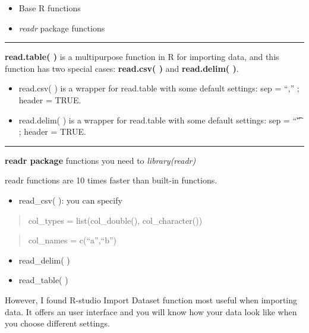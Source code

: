 \documentclass[]{book}
\providecommand{\tightlist}{%
  \setlength{\itemsep}{0pt}\setlength{\parskip}{0pt}}
\begin{document}
\begin{itemize}
\item
  Base R functions
\item
  \emph{readr} package functions
\end{itemize}

\begin{center}\rule{0.5\linewidth}{\linethickness}\end{center}

\textbf{read.table( )} is a multipurpose function in R for importing
data, and this function has two special cases: \textbf{read.csv( )} and
\textbf{read.delim( )}.

\begin{itemize}
\item
  read.csv( ) is a wrapper for read.table with some default settings:
  sep = ``,'' ; header = TRUE.
\item
  read.delim( ) is a wrapper for read.table with some default settings:
  sep = ``\t'' ; header = TRUE.
\end{itemize}

\begin{center}\rule{0.5\linewidth}{\linethickness}\end{center}

\textbf{readr package} functions you need to \emph{library(readr)}

readr functions are 10 times faster than built-in functions.

\begin{itemize}
\tightlist
\item
  read\_csv( ): you can specify
\end{itemize}

\begin{quote}
col\_types = list(col\_double(), col\_character())
\end{quote}

\begin{quote}
col\_names = c(``a'',``b'')
\end{quote}

\begin{itemize}
\item
  read\_delim( )
\item
  read\_table( )
\end{itemize}

However, I found R-studio Import Dataset function most useful when
importing data. It offers an user interface and you will know how your
data look like when you choose different settings.
\end{document}
